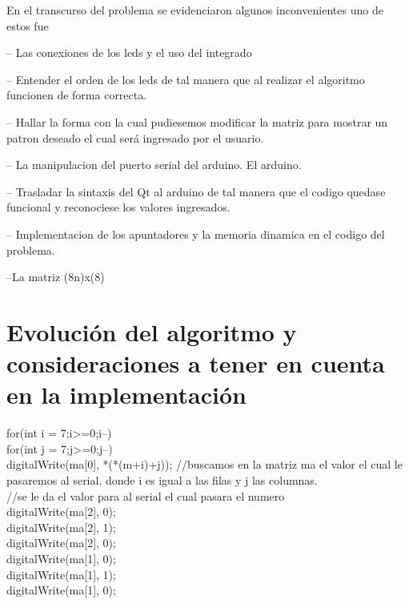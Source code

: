 \documentclass{article}
\begin{document}
En el transcurso del problema se evidenciaron algunos inconvenientes uno de estos fue

-- Las conexiones de los leds y el uso del integrado 

-- Entender el orden de los leds de tal manera que al realizar el algoritmo funcionen de forma correcta.

-- Hallar la forma con la cual pudiesemos modificar la matriz para mostrar un patron deseado el cual será ingresado por el usuario.

-- La manipulacion del puerto serial del arduino. El arduino.

-- Trasladar la sintaxis del Qt al arduino de tal manera que el codigo quedase funcional y reconociese los valores ingresados.

-- Implementacion de los apuntadores y la memoria dinamica en el codigo del problema.

--La matriz (8n)x(8) 

\section{Evolución del algoritmo y consideraciones a tener en cuenta en la implementación}\label{contenido}

for(int i = 7;i>=0;i--) \\
  {
    for(int j = 7;j>=0;j--) \\
    {
      digitalWrite(ma[0], *(*(m+i)+j)); //buscamos en la matriz ma el valor el cual le pasaremos al serial.
donde i es igual a las filas y j las columnas.\\
      //se le da el valor para al serial el cual pasara el numero \\
  
      digitalWrite(ma[2], 0); \\
      digitalWrite(ma[2], 1);\\
      digitalWrite(ma[2], 0);\\

      digitalWrite(ma[1], 0);\\
      digitalWrite(ma[1], 1);\\
      digitalWrite(ma[1], 0);  \\    
    }    \\
  }   \\
\end{document}
